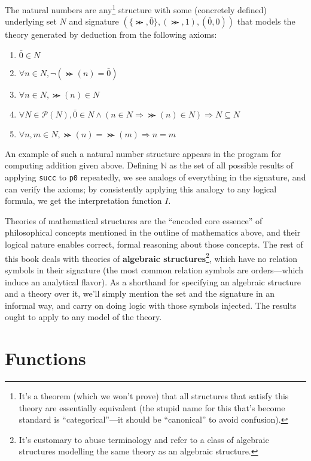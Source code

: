 \begin{definition}
  The natural numbers are any\footnote
  {
    It's a theorem (which we won't prove) that all structures that satisfy this theory are essentially equivalent
    (the stupid name for this that's become standard is ``categorical''---it should be ``canonical'' to avoid confusion).
  }
  structure with some (concretely defined) underlying set ${N}$ and signature $(\{\Succ, \bar{0}\}, {(\Succ, 1), (\bar{0}, 0)})$
  that models the theory generated by deduction from the following axioms:
  \begin{enumerate}
  \item $\bar{0} \in {N}$
  \item $\forall n \in {N}, \lnot(\Succ(n) = \bar{0})$
  \item $\forall n \in {N}, \Succ(n) \in {N}$
  \item $\forall N \in \mathcal{P}({N}), \bar{0} \in N \land (n \in N \Rightarrow \Succ(n) \in N) \Rightarrow {N} \subseteq N$
  \item $\forall n,m \in {N}, \Succ(n) = \Succ(m) \Rightarrow n = m$
  \end{enumerate}
\end{definition}

An example of such a natural number structure appears in the program for computing addition given above.
Defining $\mathbb{N}$ as the set of all possible results of applying \verb|succ| to \verb|p0| repeatedly,
we see analogs of everything in the signature, and can verify the axioms;
by consistently applying this analogy to any logical formula, we get the interpretation function $I$.

Theories of mathematical structures are the ``encoded core essence'' of philosophical concepts mentioned in the outline of mathematics above,
and their logical nature enables correct, formal reasoning about those concepts.
The rest of this book deals with theories of \textbf{algebraic structures}\footnote
{
  It's customary to abuse terminology and refer to a class of algebraic structures modelling the same theory as an algebraic structure.
},
which have no relation symbols in their signature (the most common relation symbols are orders---which induce an analytical flavor).
As a shorthand for specifying an algebraic structure and a theory over it, we'll simply mention the set and the signature in an informal way,
and carry on doing logic with those symbols injected.
The results ought to apply to any model of the theory.

\section{Functions}

